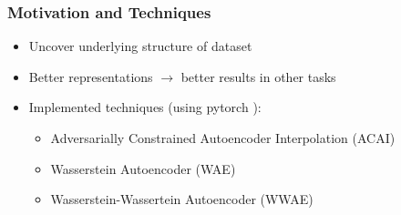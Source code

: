 \documentclass{beamer}
\begin{document}
\begin{frame}
\frametitle{Motivation and Techniques}
\begin{itemize}
  \item Uncover underlying structure of dataset
  \item Better representations $\rightarrow$ better results in other tasks
\end{itemize}
\bigskip
\begin{itemize}
  \item Implemented techniques (using pytorch \cite{pytorch}):
  \begin{itemize}
    \item Adversarially Constrained Autoencoder Interpolation (ACAI) \cite{acai}
    \medskip
    \item Wasserstein Autoencoder (WAE) \cite{wae}
    \medskip
    \item Wasserstein-Wassertein Autoencoder (WWAE) \cite{wwae}
  \end{itemize}
\end{itemize}
\end{frame}
\end{document}
